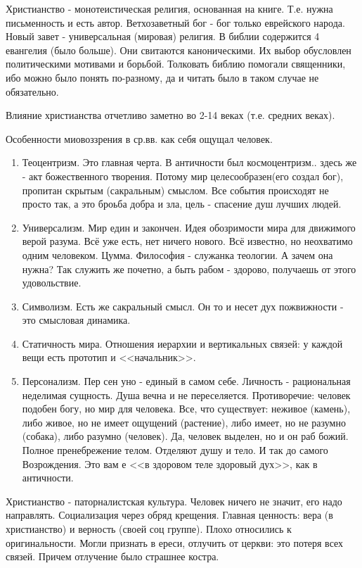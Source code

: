 Христианство - монотеистическая религия, основанная на книге. Т.е. нужна письменность и есть автор.
Ветхозаветный бог - бог только еврейского народа.
Новый завет - универсальная (мировая) религия.
В библии содержится 4 евангелия (было больше). Они свитаются каноническими. Их выбор обусловлен политическими мотивами и борьбой. Толковать библию помогали священники, ибо можно было понять по-разному, да и читать было в таком случае не обязательно.

Влияние христианства отчетливо заметно во 2-14 веках (т.е. средних веках).

Особенности миовоззрения в ср.вв. как себя ощущал человек.

\begin{enumerate}
	\item Теоцентризм. Это главная черта. В античности был космоцентризм.. здесь же - акт божественного творения. Потому мир целесообразен(его создал бог), пропитан скрытым (сакральным) смыслом. Все события происходят не просто так, а это броьба добра и зла, цель - спасение душ лучших людей.
	\item Универсализм. Мир един и закончен. Идея обозримости мира для движимого верой разума. Всё уже есть, нет ничего нового. Всё известно, но неохватимо одним человеком. Цумма. Философия - служанка теологии. А зачем она нужна? Так служить же почетно, а быть рабом - здорово, получаешь от этого удовольствие.
	\item Символизм. Есть же сакральный смысл. Он то и несет дух пожвижности - это смысловая динамика.
	\item Статичность мира. Отношения иерархии и вертикальных связей: у каждой вещи есть прототип и <<начальник>>.
	\item Персонализм. Пер сен уно - единый в самом себе. Личность - рациональная неделимая сущность. Душа вечна и не переселяется. Противоречие: человек подобен богу, но мир для человека. Все, что существует: неживое (камень), либо живое, но не имеет ощущений (растение), либо имеет, но не разумно (собака), либо разумно (человек). Да, человек выделен, но и он раб божий. Полное пренебрежение телом. Отделяют душу и тело. И так до самого Возрождения. Это вам е <<в здоровом теле здоровый дух>>, как в античности.
\end{enumerate}

Христианство - паторналистская культура.
Человек ничего не значит, его надо направлять.
Социализация через обряд крещения.
Главная ценность: вера (в христианство) и верность (своей соц группе).
Плохо относились к оригинальности. Могли признать в ереси, отлучить от церкви: это потеря всех связей. Причем отлучение было страшнее костра.

